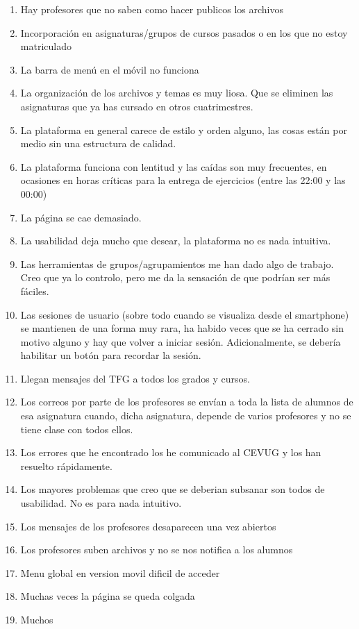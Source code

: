 \begin{enumerate}
\item Hay profesores que no saben como hacer publicos los archivos
\item Incorporación en asignaturas/grupos de cursos pasados o en los que no estoy matriculado
\item La barra de menú en el móvil no funciona
\item La organización de los archivos y temas es muy liosa. Que se eliminen las asignaturas que ya has cursado en otros cuatrimestres.
\item La plataforma en general carece de estilo y orden alguno, las cosas están por medio sin una estructura de calidad.
\item La plataforma funciona con lentitud y las caídas son muy frecuentes, en ocasiones en horas críticas para la entrega de ejercicios (entre las 22:00 y las 00:00)
\item La página se cae demasiado.
\item La usabilidad deja mucho que desear, la plataforma no es nada intuitiva.
\item Las herramientas de grupos/agrupamientos me han dado algo de trabajo. Creo que ya lo controlo, pero me da la sensación de que podrían ser más fáciles.
\item Las sesiones de usuario (sobre todo cuando se visualiza desde el smartphone) se mantienen de una forma muy rara, ha habido veces que se ha cerrado sin motivo alguno y hay que volver a iniciar sesión. Adicionalmente, se debería habilitar un botón para recordar la sesión.
\item Llegan mensajes del TFG a todos los grados y cursos.
\item Los correos por parte de los profesores se envían a toda la lista de alumnos de esa asignatura cuando, dicha asignatura, depende de varios profesores y no se tiene clase con todos ellos.
\item Los errores que he encontrado los he comunicado al CEVUG y los han resuelto rápidamente.
\item Los mayores problemas que creo que se deberian subsanar son todos de usabilidad. No es para nada intuitivo.
\item Los mensajes de los profesores desaparecen una vez abiertos
\item Los profesores suben archivos y no se nos notifica a los alumnos
\item Menu global en version movil dificil de acceder
\item Muchas veces la página se queda colgada
\item Muchos

\end{enumerate}
